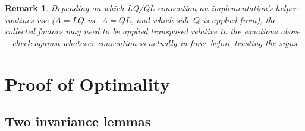 \documentclass[11pt]{article}
\newtheorem{remark}{Remark}
\begin{document}
\begin{remark}
Depending on which LQ/QL convention an implementation's helper routines use
($A=LQ$ vs.\ $A=QL$, and which side $Q$ is applied from), the collected factors
may need to be applied transposed relative to the equations above -- check
against whatever convention is actually in force before trusting the signs.
\end{remark}

\section{Proof of Optimality}

\subsection{Two invariance lemmas}
\end{document}
